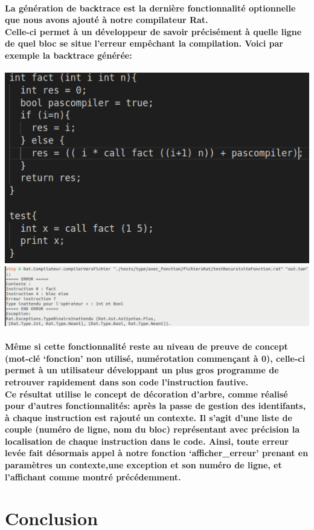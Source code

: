 \documentclass[french]{article}
\begin{document}
\paragraph{La génération de backtrace est la dernière fonctionnalité optionnelle que nous avons ajouté à notre compilateur Rat. \\
Celle-ci permet à un développeur de savoir précisément à quelle ligne de quel bloc se situe l'erreur empêchant la compilation. 
Voici par exemple la backtrace générée:}
\begin{center}
        \includegraphics[scale=0.4]{code_compile_pas.png}
        \includegraphics[scale=0.4]{backtrace.png}
\end{center}
\paragraph{
Même si cette fonctionnalité reste au niveau de preuve de concept (mot-clé `fonction' non utilisé, numérotation commençant à 0), celle-ci
permet à un utilisateur développant un plus gros programme de retrouver rapidement dans son code l'instruction fautive. \\
Ce résultat utilise le concept de décoration d'arbre, comme réalisé pour d'autres fonctionnalités: après la passe de gestion des identifants,
à chaque instruction est rajouté un contexte. Il s'agit d'une liste de couple (numéro de ligne, nom du bloc) représentant avec précision la localisation
de chaque instruction dans le code. Ainsi, toute erreur levée fait désormais appel à notre fonction `afficher\_erreur' prenant en paramètres
un contexte,une exception et son numéro de ligne, et l'affichant comme montré précédemment.}
\section{Conclusion}
\end{document}
